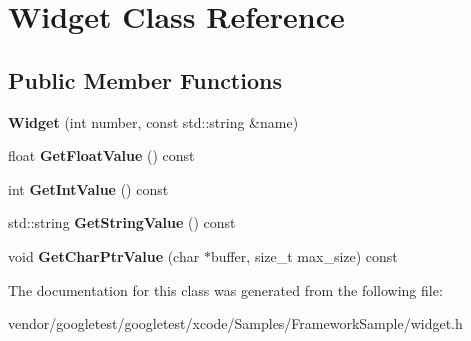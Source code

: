 \hypertarget{classWidget}{}\section{Widget Class Reference}
\label{classWidget}
\subsection*{Public Member Functions}
\begin{DoxyCompactItemize}
\item 
{\bfseries Widget} (int number, const std\+::string \&name)\hypertarget{classWidget_ab573b75a8a69d29c298af2485fb9cda9}{}\label{classWidget_ab573b75a8a69d29c298af2485fb9cda9}

\item 
float {\bfseries Get\+Float\+Value} () const \hypertarget{classWidget_a95fac059ee7d3b7e2df2beb4d1b94dfa}{}\label{classWidget_a95fac059ee7d3b7e2df2beb4d1b94dfa}

\item 
int {\bfseries Get\+Int\+Value} () const \hypertarget{classWidget_a699748239d35b7f6de47db34e1d4a624}{}\label{classWidget_a699748239d35b7f6de47db34e1d4a624}

\item 
std\+::string {\bfseries Get\+String\+Value} () const \hypertarget{classWidget_ac154bf7cf4589a9e67ea29b0904eab87}{}\label{classWidget_ac154bf7cf4589a9e67ea29b0904eab87}

\item 
void {\bfseries Get\+Char\+Ptr\+Value} (char $\ast$buffer, size\+\_\+t max\+\_\+size) const \hypertarget{classWidget_af04038bacd7f650695b4c92d45ee2cbd}{}\label{classWidget_af04038bacd7f650695b4c92d45ee2cbd}

\end{DoxyCompactItemize}


The documentation for this class was generated from the following file\+:\begin{DoxyCompactItemize}
\item 
vendor/googletest/googletest/xcode/\+Samples/\+Framework\+Sample/widget.\+h\end{DoxyCompactItemize}
